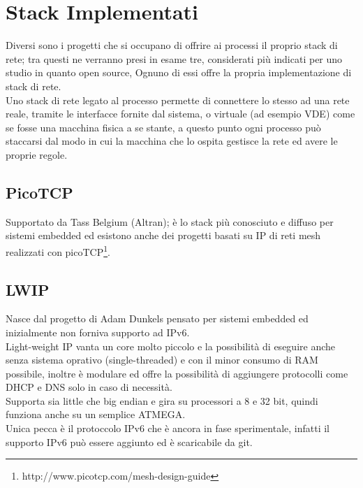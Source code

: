 \section{Stack Implementati}
Diversi sono i progetti che si occupano di offrire ai processi il proprio stack di rete; tra questi ne verranno presi in esame tre, considerati pi\`u indicati per uno studio in quanto open source, Ognuno di essi offre la propria implementazione di stack di rete.\\
Uno stack di rete legato al processo permette di connettere lo stesso ad una rete reale, tramite le interfacce fornite dal sistema, o virtuale (ad esempio VDE) come se fosse una macchina fisica a se stante, a questo punto ogni processo pu\`o staccarsi dal modo in cui la macchina che lo ospita gestisce la rete ed avere le proprie regole.\\

\subsection{PicoTCP}
Supportato da Tass Belgium (Altran); \`e lo stack pi\`u conosciuto e diffuso per sistemi embedded ed esistono anche dei progetti basati su IP di reti mesh realizzati con picoTCP\footnote{http://www.picotcp.com/mesh-design-guide}.
\subsection{LWIP}
Nasce dal progetto di Adam Dunkels pensato per sistemi embedded ed inizialmente non forniva supporto ad IPv6.\\
Light-weight IP vanta un core molto piccolo e la possibilit\`a di eseguire anche senza sistema oprativo (single-threaded) e con il minor consumo di RAM possibile, inoltre \`e modulare ed offre la possibilit\`a di aggiungere protocolli come DHCP e DNS solo in caso di necessit\`a.\\
Supporta sia little che big endian e gira su processori a 8 e 32 bit, quindi funziona anche su un semplice ATMEGA.\\
Unica pecca \`e il protoccolo IPv6 che \`e ancora in fase sperimentale, infatti il supporto IPv6 pu\`o essere aggiunto ed \`e scaricabile da git.
